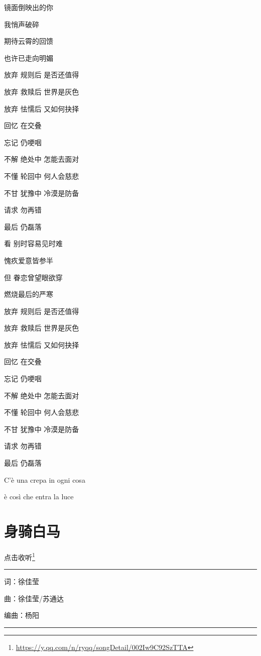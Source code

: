 \documentclass[]{ctexbook}
\renewcommand{\href}[2]{#2\footnote{\url{#1}}}
\begin{document}
镜面倒映出的你

我悄声破碎

期待云霄的回馈

也许已走向明媚

放弃 规则后 是否还值得

放弃 救赎后 世界是灰色

放弃 怯懦后 又如何抉择

回忆 在交叠

忘记 仍哽咽

不解 绝处中 怎能去面对

不懂 轮回中 何人会慈悲

不甘 犹豫中 冷漠是防备

请求 勿再错

最后 仍磊落

看 别时容易见时难

愧疚爱意皆参半

但 眷恋曾望眼欲穿

燃烧最后的严寒

放弃 规则后 是否还值得

放弃 救赎后 世界是灰色

放弃 怯懦后 又如何抉择

回忆 在交叠

忘记 仍哽咽

不解 绝处中 怎能去面对

不懂 轮回中 何人会慈悲

不甘 犹豫中 冷漠是防备

请求 勿再错

最后 仍磊落

C'è una crepa in ogni cosa

è così che entra la luce

\section*{身骑白马}\label{on-the-white-horse}


\href{https://y.qq.com/n/ryqq/songDetail/002Iw9C92SzTTA}{点击收听}

\begin{center}\rule{0.5\linewidth}{0.5pt}\end{center}

词：徐佳莹

曲：徐佳莹/苏通达

编曲：杨阳

\begin{center}\rule{0.5\linewidth}{0.5pt}\end{center}
\end{document}
